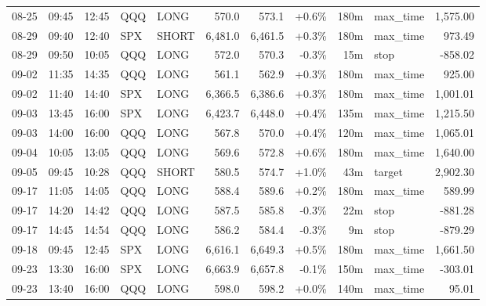 \documentclass[11pt,a4paper,twoside]{article}
\begin{document}
\begin{center}
\begin{longtable}{>{\color{txtmain}}l l l l l r r r r >{\color{txtmain}}l r}
08-25 & 09:45 & 12:45 & QQQ & LONG & 570.0 & 573.1 & \textcolor{wingreen}{+0.6\%} & 180m & max\_time & \textcolor{wingreen}{1,575.00} \\
08-29 & 09:40 & 12:40 & SPX & SHORT & 6,481.0 & 6,461.5 & \textcolor{wingreen}{+0.3\%} & 180m & max\_time & \textcolor{wingreen}{973.49} \\
08-29 & 09:50 & 10:05 & QQQ & LONG & 572.0 & 570.3 & \textcolor{lossred}{-0.3\%} & 15m & stop & \textcolor{lossred}{-858.02} \\
09-02 & 11:35 & 14:35 & QQQ & LONG & 561.1 & 562.9 & \textcolor{wingreen}{+0.3\%} & 180m & max\_time & \textcolor{wingreen}{925.00} \\
09-02 & 11:40 & 14:40 & SPX & LONG & 6,366.5 & 6,386.6 & \textcolor{wingreen}{+0.3\%} & 180m & max\_time & \textcolor{wingreen}{1,001.01} \\
09-03 & 13:45 & 16:00 & SPX & LONG & 6,423.7 & 6,448.0 & \textcolor{wingreen}{+0.4\%} & 135m & max\_time & \textcolor{wingreen}{1,215.50} \\
09-03 & 14:00 & 16:00 & QQQ & LONG & 567.8 & 570.0 & \textcolor{wingreen}{+0.4\%} & 120m & max\_time & \textcolor{wingreen}{1,065.01} \\
09-04 & 10:05 & 13:05 & QQQ & LONG & 569.6 & 572.8 & \textcolor{wingreen}{+0.6\%} & 180m & max\_time & \textcolor{wingreen}{1,640.00} \\
09-05 & 09:45 & 10:28 & QQQ & SHORT & 580.5 & 574.7 & \textcolor{wingreen}{+1.0\%} & 43m & target & \textcolor{wingreen}{2,902.30} \\
09-17 & 11:05 & 14:05 & QQQ & LONG & 588.4 & 589.6 & \textcolor{wingreen}{+0.2\%} & 180m & max\_time & \textcolor{wingreen}{589.99} \\
09-17 & 14:20 & 14:42 & QQQ & LONG & 587.5 & 585.8 & \textcolor{lossred}{-0.3\%} & 22m & stop & \textcolor{lossred}{-881.28} \\
09-17 & 14:45 & 14:54 & QQQ & LONG & 586.2 & 584.4 & \textcolor{lossred}{-0.3\%} & 9m & stop & \textcolor{lossred}{-879.29} \\
09-18 & 09:45 & 12:45 & SPX & LONG & 6,616.1 & 6,649.3 & \textcolor{wingreen}{+0.5\%} & 180m & max\_time & \textcolor{wingreen}{1,661.50} \\
09-23 & 13:30 & 16:00 & SPX & LONG & 6,663.9 & 6,657.8 & \textcolor{lossred}{-0.1\%} & 150m & max\_time & \textcolor{lossred}{-303.01} \\
09-23 & 13:40 & 16:00 & QQQ & LONG & 598.0 & 598.2 & \textcolor{wingreen}{+0.0\%} & 140m & max\_time & \textcolor{wingreen}{95.01} \\

\end{longtable}
\end{center}
\end{document}
